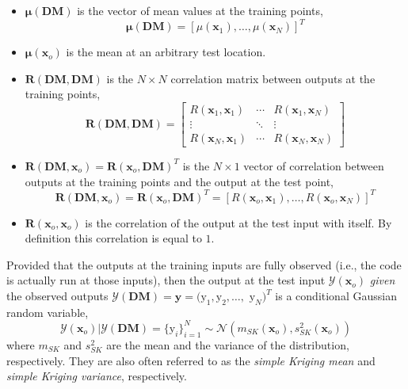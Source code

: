 \begin{itemize}

	\item $\boldsymbol{\mu}(\mathbf{DM})$ is the vector of mean values at the training points,
		\begin{equation}
			\boldsymbol{\mu}(\mathbf{DM}) = [\mu(\mathbf{x}_1), \ldots, \mu(\mathbf{x}_N)]^T 
		\label{eq:training_mean_vector}
		\end{equation}

	\item $\boldsymbol{\mu}(\bm{x}_o)$ is the mean at an arbitrary test location.

	\item $\mathbf{R}(\mathbf{DM}, \mathbf{DM})$ is the $N \times N$ correlation matrix between outputs at the training points,
		\begin{equation}
			\mathbf{R}(\mathbf{DM}, \mathbf{DM}) = 
				\begin{bmatrix}
					R(\mathbf{x}_1, \mathbf{x}_1)	& \cdots		& R(\mathbf{x}_1, \mathbf{x}_N) \\
					\vdots												& \ddots		&	\vdots \\
					R(\mathbf{x}_N, \mathbf{x}_1)	&	\cdots    & R(\mathbf{x}_N, \mathbf{x}_N)
				\end{bmatrix}
		\label{eq:training_correlation_matrix}
		\end{equation}

	\item $\mathbf{R}(\mathbf{DM}, \bm{x}_o) = \mathbf{R}(\bm{x}_o, \mathbf{DM})^T$ is the $N \times 1$ vector of correlation between outputs at the training points and the output at the test point,
			\begin{equation}
				\mathbf{R}(\mathbf{DM}, \bm{x}_o) = \mathbf{R}(\bm{x}_o, \mathbf{DM})^T =  [R(\bm{x}_o, \mathbf{x}_1), \ldots, R(\bm{x}_o, \mathbf{x}_N)]^T
			\label{eq:training_test_correlation}
			\end{equation}
		
		\item $\mathbf{R}(\bm{x}_o, \bm{x}_o)$ is the correlation of the output at the test input with itself. By definition this correlation is equal to $1$.

\end{itemize}

Provided that the outputs at the training inputs are fully observed (i.e., the code is actually run at those inputs),
then the output at the test input $\mathcal{Y}(\bm{x}_o)$ \emph{given} the observed outputs $\mathcal{Y}(\mathbf{DM}) = \mathbf{y} = (\text{y}_1, \text{y}_2, \ldots,$ 
$\text{y}_N)^T$ is a conditional Gaussian random variable,
\begin{equation}
	\mathcal{Y}(\mathbf{x}_o) | \mathcal{Y}(\mathbf{DM}) = \{\text{y}_i\}_{i=1}^N \sim \mathcal{N} \left( m_{SK}(\bm{x}_o), s^2_{SK}(\bm{x}_o)\right)
\label{eq:conditional_training_test}
\end{equation}
where $m_{SK}$ and $s^2_{SK}$ are the mean and the variance of the distribution, respectively.
They are also often referred to as the \emph{simple Kriging mean} and \emph{simple Kriging variance}, respectively.

